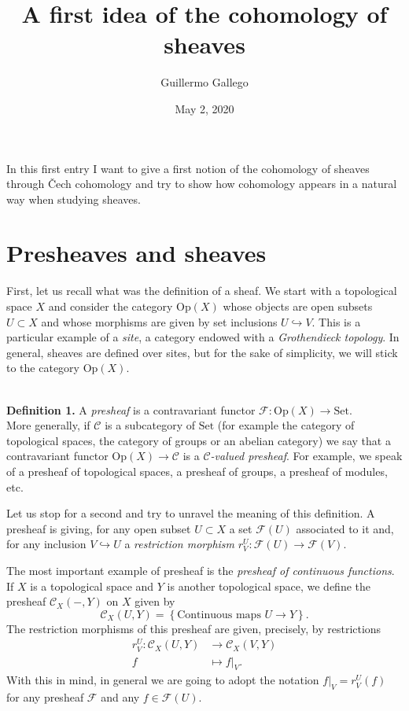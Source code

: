 \documentclass[12pt,a4paper]{article}
\author{Guillermo Gallego}
\title{A first idea of the cohomology of sheaves}
\date{May 2, 2020}
\begin{document}
\maketitle

In this first entry I want to give a first notion of the cohomology of sheaves through \v{C}ech cohomology and try to show how cohomology appears in a natural way when studying sheaves. 

\section*{Presheaves and sheaves}
First, let us recall what was the definition of a sheaf. We start with a topological space $X$ and consider the category $\mathrm{Op}(X)$ whose objects are open subsets $U\subset X$ and whose morphisms are given by set inclusions $U\hookrightarrow V$. This is a particular example of a \emph{site}, a category endowed with a \emph{Grothendieck topology}. In general, sheaves are defined over sites, but for the sake of simplicity, we will stick to the category $\mathrm{Op}(X)$.

\ \\ 
\textbf{Definition 1.} A \emph{presheaf} is a contravariant functor $\mathcal{F}:\mathrm{Op}(X) \rightarrow \mathrm{Set}$. \\

More generally, if $\mathcal{C}$ is a subcategory of $\mathrm{Set}$ (for example the category of topological spaces, the category of groups or an abelian category) we say that a contravariant functor $\mathrm{Op}(X) \rightarrow \mathcal{C}$ is a \emph{$\mathcal{C}$-valued presheaf}. For example, we speak of a presheaf of topological spaces, a presheaf of groups, a presheaf of modules, etc. 

Let us stop for a second and try to unravel the meaning of this definition. A presheaf is giving, for any open subset $U\subset X$ a set $\mathcal{F}(U)$ associated to it and, for any inclusion $V\hookrightarrow U$ a \emph{restriction morphism} $r^U_V: \mathcal{F}(U) \rightarrow \mathcal{F}(V)$.

The most important example of presheaf is the \emph{presheaf of continuous functions}. If $X$ is a topological space and $Y$ is another topological space, we define the presheaf $\mathcal{C}_X(-,Y)$ on $X$ given by
\begin{equation*}
  \mathcal{C}_X (U,Y) = \left\{ \text{Continuous maps } U\rightarrow Y \right\}.
\end{equation*}
The restriction morphisms of this presheaf are given, precisely, by restrictions
\begin{align*}
  r^U_V :\mathcal{C}_X(U,Y)&\longrightarrow \mathcal{C}_X(V,Y)\\ 
    f &\longmapsto f|_V. 
  \end{align*}
  With this in mind, in general we are going to adopt the notation $f|_V=r^U_V(f)$ for any presheaf $\mathcal{F}$ and any $f\in \mathcal{F}(U)$.
\end{document}
